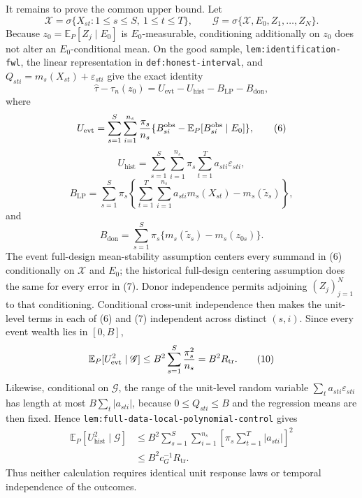 It remains to prove the common upper bound.  Let
\[
\mathscr X=\sigma\{X_{st}:1\le s\le S,\ 1\le t\le T\},
\qquad
\mathscr G=\sigma\{\mathscr X,E_0,Z_1,\ldots,Z_N\}.
\]
Because \(z_0=\mathbb E_P[Z_j\mid E_0]\) is \(E_0\)-measurable, conditioning additionally on \(z_0\) does not alter an \(E_0\)-conditional mean.  On the good sample, \texttt{lem:identification-fwl}, the linear representation in \texttt{def:honest-interval}, and \(Q_{sti}=m_s(X_{st})+\varepsilon_{sti}\) give the exact identity
\[
\widehat\tau-\tau_n(z_0)
=U_{\mathrm{evt}}-U_{\mathrm{hist}}-B_{\mathrm{LP}}-B_{\mathrm{don}},
\tag{5}
\]
where
\[
U_{\mathrm{evt}}
=\sum_{s=1}^{S}\sum_{i=1}^{n_s}{\pi_s\over n_s}
\{B_{si}^{\mathrm{obs}}-\mathbb E_P[B_{si}^{\mathrm{obs}}\mid E_0]\},
\tag{6}
\]
\[
U_{\mathrm{hist}}
=\sum_{s=1}^{S}\sum_{i=1}^{n_s}\pi_s
\sum_{t=1}^{T}a_{sti}\varepsilon_{sti},
\tag{7}
\]
\[
B_{\mathrm{LP}}
=\sum_{s=1}^{S}\pi_s
\left\{\sum_{t=1}^{T}\sum_{i=1}^{n_s}a_{sti}m_s(X_{st})
-m_s(\widetilde z_s)\right\},
\tag{8}
\]
and
\[
B_{\mathrm{don}}
=\sum_{s=1}^{S}\pi_s\{m_s(\widetilde z_s)-m_s(z_{0s})\}.
\tag{9}
\]
The event full-design mean-stability assumption centers every summand in (6) conditionally on \(\mathscr X\) and \(E_0\); the historical full-design centering assumption does the same for every error in (7).  Donor independence permits adjoining \((Z_j)_{j=1}^{N}\) to that conditioning.  Conditional cross-unit independence then makes the unit-level terms in each of (6) and (7) independent across distinct \((s,i)\).  Since every event wealth lies in \([0,B]\),
\[
\mathbb E_P[U_{\mathrm{evt}}^2\mid\mathscr G]
\le B^2\sum_{s=1}^{S}{\pi_s^2\over n_s}
=B^2R_{\mathrm{tr}}.
\tag{10}
\]
Likewise, conditional on \(\mathscr G\), the range of the unit-level random variable \(\sum_t a_{sti}\varepsilon_{sti}\) has length at most \(B\sum_t|a_{sti}|\), because \(0\le Q_{sti}\le B\) and the regression means are then fixed.  Hence \texttt{lem:full-data-local-polynomial-control} gives
\[
\begin{aligned}
\mathbb E_P[U_{\mathrm{hist}}^2\mid\mathscr G]
&\le B^2\sum_{s=1}^{S}\sum_{i=1}^{n_s}
 \left[\pi_s\sum_{t=1}^{T}|a_{sti}|\right]^2\\
&\le B^2c_G^{-1}R_{\mathrm{tr}}.
\end{aligned}
\tag{11}
\]
Thus neither calculation requires identical unit response laws or temporal independence of the outcomes.

